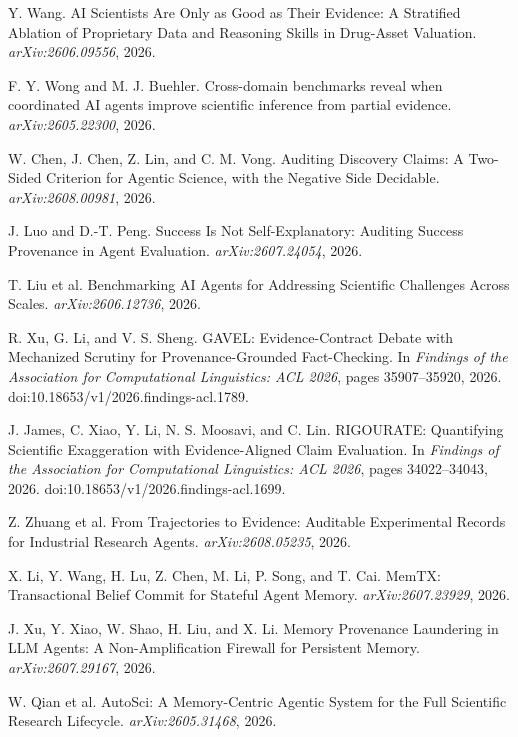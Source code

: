 Y. Wang. AI Scientists Are Only as Good as Their Evidence: A Stratified Ablation of Proprietary Data and Reasoning Skills in Drug-Asset Valuation. \emph{arXiv:2606.09556}, 2026.

F. Y. Wong and M. J. Buehler. Cross-domain benchmarks reveal when coordinated AI agents improve scientific inference from partial evidence. \emph{arXiv:2605.22300}, 2026.

W. Chen, J. Chen, Z. Lin, and C. M. Vong. Auditing Discovery Claims: A Two-Sided Criterion for Agentic Science, with the Negative Side Decidable. \emph{arXiv:2608.00981}, 2026.

J. Luo and D.-T. Peng. Success Is Not Self-Explanatory: Auditing Success Provenance in Agent Evaluation. \emph{arXiv:2607.24054}, 2026.

T. Liu et al. Benchmarking AI Agents for Addressing Scientific Challenges Across Scales. \emph{arXiv:2606.12736}, 2026.

R. Xu, G. Li, and V. S. Sheng. GAVEL: Evidence-Contract Debate with Mechanized Scrutiny for Provenance-Grounded Fact-Checking. In \emph{Findings of the Association for Computational Linguistics: ACL 2026}, pages 35907--35920, 2026. doi:10.18653/v1/2026.findings-acl.1789.

J. James, C. Xiao, Y. Li, N. S. Moosavi, and C. Lin. RIGOURATE: Quantifying Scientific Exaggeration with Evidence-Aligned Claim Evaluation. In \emph{Findings of the Association for Computational Linguistics: ACL 2026}, pages 34022--34043, 2026. doi:10.18653/v1/2026.findings-acl.1699.

Z. Zhuang et al. From Trajectories to Evidence: Auditable Experimental Records for Industrial Research Agents. \emph{arXiv:2608.05235}, 2026.

X. Li, Y. Wang, H. Lu, Z. Chen, M. Li, P. Song, and T. Cai. MemTX: Transactional Belief Commit for Stateful Agent Memory. \emph{arXiv:2607.23929}, 2026.

J. Xu, Y. Xiao, W. Shao, H. Liu, and X. Li. Memory Provenance Laundering in LLM Agents: A Non-Amplification Firewall for Persistent Memory. \emph{arXiv:2607.29167}, 2026.

W. Qian et al. AutoSci: A Memory-Centric Agentic System for the Full Scientific Research Lifecycle. \emph{arXiv:2605.31468}, 2026.

